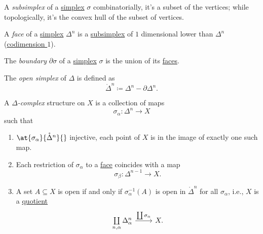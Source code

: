\begin{definition}[Subsimplex]\label{def:subsimplex}
	A \emph{subsimplex} of a \hyperref[def:standard-simplex]{simplex} \(\sigma \) combinatorially, it's a
	subset of the vertices; while topologically, it's the convex hull of the subset of vertices.
	\begin{figure}[H]
		\centering
		\label{fig:def:subsimplex}
	\end{figure}
\end{definition}

\begin{definition}[Face]\label{def:face}
	A \emph{face} of a \hyperref[def:standard-simplex]{simplex} \(\Delta ^n\) is a \hyperref[def:subsimplex]{subsimplex} of \(1\) dimensional lower
	than \(\Delta ^n\) (\underline{codimension \(1\)}).
\end{definition}

\begin{definition}[Boundary]\label{def:boundary}
	The \emph{boundary} \(\partial \sigma \) of a \hyperref[def:standard-simplex]{simplex} \(\sigma \) is the union of its \hyperref[def:face]{faces}.
\end{definition}

\begin{definition}\label{def:open-simplex}
	The \emph{open simplex} of \(\Delta \) is defined as
	\[
		\mathring{\Delta}^n \coloneqq \Delta^n - \partial \Delta^n.
	\]
\end{definition}

\begin{definition}\label{def:delta-complex}
	A \emph{\(\Delta \)-complex} structure on \(X\) is a collection of maps
	\[
		\sigma _\alpha \colon \Delta ^n\to X
	\]
	such that
	\begin{enumerate}
		\item \(\at{\sigma _\alpha }{\mathring{\Delta}^n}{}\) injective, each point of \(X\) is in the image of exactly one such map.
		\item Each restriction of \(\sigma _\alpha \) to a \hyperref[def:face]{face} coincides with a map
		      \[
			      \sigma _\beta \colon \Delta^{n-1} \to X.
		      \]
		\item A set \(A\subseteq X\) is open if and only if \(\sigma ^{-1} _\alpha (A)\) is open in \(\mathring{\Delta }^n\) for all
		      \(\sigma _\alpha \), i.e., \(X\) is a \hyperref[CW-complex-quotient]{quotient}
		      \[
			      \begin{tikzcd}
				      {\coprod\limits_{n, \alpha }\Delta ^n_\alpha} & {X.}
				      \arrow["{\coprod \sigma _\alpha}", from=1-1, to=1-2]
			      \end{tikzcd}
		      \]
	\end{enumerate}
\end{definition}

